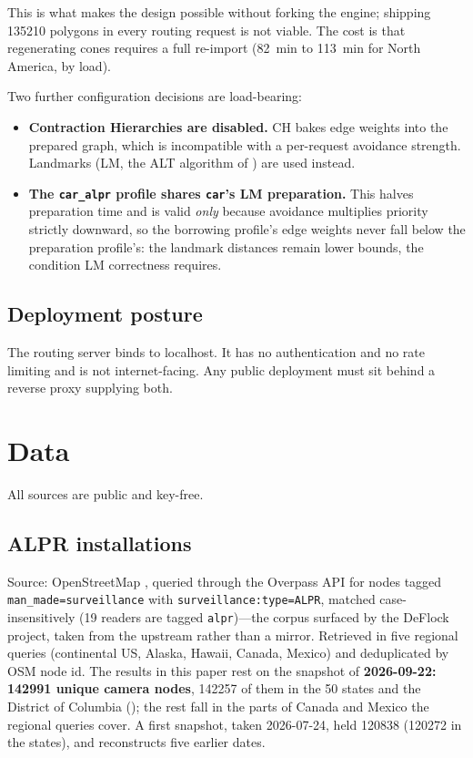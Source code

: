 \documentclass[11pt,twoside]{article}
\begin{document}
\noindent
This is what makes the design possible without forking the engine; shipping \num{135210}
polygons in every routing request is not viable. The cost is that regenerating cones
requires a full re-import (\SI{82}{\minute} to \SI{113}{\minute} for North America, by load).

Two further configuration decisions are load-bearing:

\begin{itemize}
  \item \textbf{Contraction Hierarchies are disabled.} CH \citep{geisberger2008} bakes edge
    weights into the prepared graph, which is incompatible with a per-request avoidance
    strength. Landmarks (LM, the ALT algorithm of \citet{goldberg2005}) are used instead.
  \item \textbf{The \texttt{car\_alpr} profile shares \texttt{car}'s LM preparation.} This
    halves preparation time and is valid \emph{only} because avoidance multiplies priority
    strictly downward, so the borrowing profile's edge weights never fall below the preparation
    profile's: the landmark distances remain lower bounds, the condition LM correctness
    requires.
\end{itemize}

\subsection{Deployment posture}

The routing server binds to localhost. It has no authentication and no rate limiting and
is not internet-facing. Any public deployment must sit behind a reverse proxy supplying
both.

\section{Data}
\label{sec:data}

All sources are public and key-free.

\subsection{ALPR installations}
\label{sec:data:alpr}

Source: OpenStreetMap \citep{osm}, queried through the Overpass API \citep{olbricht2015} for nodes tagged
\texttt{man\_made=\allowbreak surveillance} with \texttt{surveillance:\allowbreak type=ALPR},
matched case-insensitively (19 readers are tagged \texttt{alpr})---the corpus surfaced by the
DeFlock project, taken from the upstream rather than a mirror. Retrieved in five regional
queries (continental US, Alaska, Hawaii, Canada, Mexico) and deduplicated by OSM node id.
The results in this paper rest on the snapshot of \textbf{2026-09-22: \num{142991} unique
camera nodes}, \num{142257} of them in the 50 states and the District of Columbia
(); the rest fall in the parts of Canada and Mexico the regional queries
cover. A first snapshot, taken 2026-07-24, held \num{120838} (\num{120272} in the states),
and  reconstructs five earlier dates.
\end{document}
